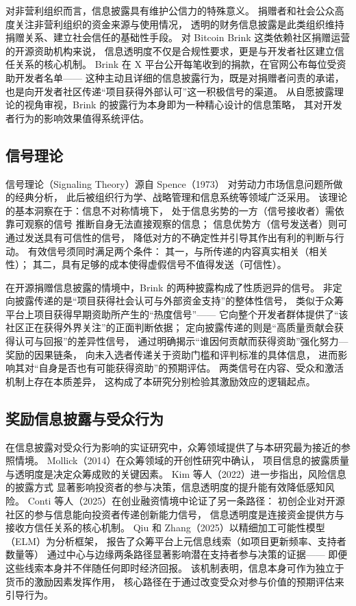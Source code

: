 对非营利组织而言，信息披露具有维护公信力的特殊意义。
捐赠者和社会公众高度关注非营利组织的资金来源与使用情况，
透明的财务信息披露是此类组织维持捐赠关系、建立社会信任的基础性手段\cite{liu2015nonprofit}。
对 Bitcoin Brink 这类依赖社区捐赠运营的开源资助机构来说，
信息透明度不仅是合规性要求，更是与开发者社区建立信任关系的核心机制。
Brink 在 X 平台公开每笔收到的捐款，在官网公布每位受资助开发者名单——
这种主动且详细的信息披露行为，既是对捐赠者问责的承诺，
也是向开发者社区传递“项目获得外部认可”这一积极信号的渠道。
从自愿披露理论的视角审视，Brink 的披露行为本身即为一种精心设计的信息策略，
其对开发者行为的影响效果值得系统评估。

\subsection{信号理论}

信号理论（Signaling Theory）源自 Spence（1973）
对劳动力市场信息问题所做的经典分析\cite{spence1973job}，
此后被组织行为学、战略管理和信息系统等领域广泛采用。
该理论的基本洞察在于：信息不对称情境下，
处于信息劣势的一方（信号接收者）需依靠可观察的信号
推断自身无法直接观察的信息；
信息优势方（信号发送者）则可通过发送具有可信性的信号，
降低对方的不确定性并引导其作出有利的判断与行动。
有效信号须同时满足两个条件：
其一，与所传递的内容真实相关（相关性）；
其二，具有足够的成本使得虚假信号不值得发送（可信性）\cite{connelly2011signaling}。

在开源捐赠信息披露的情境中，Brink 的两种披露构成了性质迥异的信号。
非定向披露传递的是“项目获得社会认可与外部资金支持”的整体性信号，
类似于众筹平台上项目获得早期资助所产生的“热度信号”——
它向整个开发者群体提供了“该社区正在获得外界关注”的正面判断依据；
定向披露传递的则是“高质量贡献会获得认可与回报”的差异性信号，
通过明确揭示“谁因何贡献而获得资助”强化努力—奖励的因果链条，
向未入选者传递关于资助门槛和评判标准的具体信息，
进而影响其对“自身是否也有可能获得资助”的预期评估。
两类信号在内容、受众和激活机制上存在本质差异，
这构成了本研究分别检验其激励效应的逻辑起点。

\subsection{奖励信息披露与受众行为}

在信息披露对受众行为影响的实证研究中，众筹领域提供了与本研究最为接近的参照情境。
Mollick（2014）在众筹领域的开创性研究中确认，
项目信息的披露质量与透明度是决定众筹成败的关键因素\cite{mollick2014dynamics}。
Kim 等人（2022）进一步指出，风险信息的披露方式
显著影响投资者的参与决策，信息透明度的提升能有效降低感知风险\cite{kim2022risk}。
Conti 等人（2025）在创业融资情境中论证了另一条路径：
初创企业对开源社区的参与信息能向投资者传递创新能力信号，
信息透明度是连接资金提供方与接收方信任关系的核心机制\cite{conti2025beefing}。
Qiu 和 Zhang（2025）以精细加工可能性模型（ELM）为分析框架，
报告了众筹平台上元信息线索（如项目更新频率、支持者数量等）
通过中心与边缘两条路径显著影响潜在支持者参与决策的证据——
即便这些线索本身并不伴随任何即时经济回报\cite{qiu2025crowdfunding}。
该机制表明，信息本身可作为独立于货币的激励因素发挥作用，
核心路径在于通过改变受众对参与价值的预期评估来引导行为。

